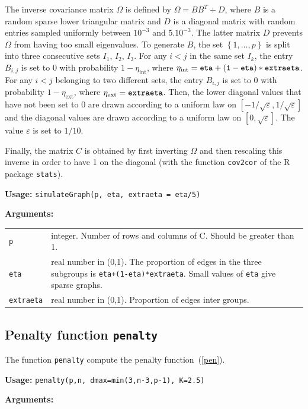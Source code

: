 \documentclass[noinfoline]{imsart}
\newcommand{\cro}[1]{\left[{#1}\right]}
\newcommand{\ac}[1]{\left\{{#1}\right\}}
\begin{document}
The inverse covariance matrix $\Omega$ is defined by $\Omega=BB^T+D$, where $B$ is a random sparse lower triangular matrix and $D$ is a diagonal matrix with random entries sampled uniformly between $10^{-3}$ and $5.10^{-3}$. The latter matrix $D$ prevents $\Omega$ from having too small eigenvalues.  To generate $B$, the set $\ac{1,\ldots,p}$ is split into three consecutive sets $I_{1}$, $I_{2}$, $I_{3}$.
For any $i<j$ in  the same set $I_{k}$,  the entry $B_{i,j}$ is set to 0 with probability $1-\eta_\mathrm{int}$, where $\eta_\mathrm{int}={\tt eta+(1-eta)*extraeta}$. For any $i<j$ belonging to two different sets, the entry $B_{i,j}$ is set to 0 with probability 
$1-\eta_\mathrm{ext}$, where  $\eta_\mathrm{ext}={\tt extraeta}$. Then, the lower diagonal values that have not been set to 0 are drawn according to a uniform law on $\cro{-1/\sqrt{\varepsilon},1/\sqrt{\varepsilon}}$ and the diagonal values are drawn according to a uniform law on $\cro{0,\sqrt{\varepsilon}}$. 
The value $\varepsilon$ is set to $1/10$.


Finally, the matrix $C$ is obtained by first inverting $\Omega$ and then rescaling this inverse in order to have 1 on the diagonal (with the function {\tt cov2cor} of the R package {\tt stats}). 
\medskip

{\bf Usage:} {\tt simulateGraph(p, eta, extraeta = eta/5)}
\medskip

{\bf Arguments:}

 \begin{tabular}{lp{13cm}}
{\tt p}&	 integer. Number of rows and columns of C. Should be greater than 1.\\
{\tt eta} &	 real number in (0,1). The proportion of edges in the three subgroups is {\tt eta+(1-eta)*extraeta}. Small values of {\tt eta} give sparse graphs.\\
{\tt extraeta} &	 real number in (0,1). Proportion of edges inter groups.\\
\end{tabular}


\subsection{Penalty function {\tt penalty}}
The function {\tt penalty}  compute the penalty function~(\ref{pen}).\medskip

{\bf Usage:} {\tt penalty(p,n, dmax=min(3,n-3,p-1), K=2.5) }\medskip


{\bf Arguments:}
\end{document}
